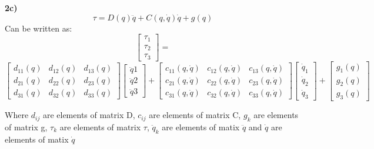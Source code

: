 \documentclass[12pt,norsk,a4paper]{article}
\begin{document}
    \newpage
    \textbf{2c)}\\
    \[\tau = D(q)\ddot q + C(q,\dot q)\dot q +g(q)\]
    Can be written as:
    \[\left[\begin{array}{c} \tau_1 \\ \tau_2 \\ \tau_3 \end{array}\right] = \]
            \[\left[\begin{array}{ccc}
                    d_{11}(q) & d_{12}(q) & d_{13}(q)\\
                    d_{21}(q) & d_{22}(q) & d_{23}(q)\\
                    d_{31}(q) & d_{32}(q) & d_{33}(q)
                \end{array}\right] \left[\begin{array}{c} \ddot q1 \\ \ddot q2 \\ \ddot q3 \end{array}\right]
            +\left[\begin{array}{ccc}
                c_{11}(q,\dot q) & c_{12}(q,\dot q) & c_{13}(q,\dot q)\\
                c_{21}(q,\dot q) & c_{22}(q,\dot q) & c_{23}(q,\dot q)\\
                c_{31}(q,\dot q) & c_{32}(q,\dot q) & c_{33}(q,\dot q)
            \end{array}\right] \left[\begin{array}{c} \dot q_1 \\ \dot q_2 \\ \dot q_3 \end{array}\right]
            +\left[\begin{array}{c}
                g_1(q) \\ g_2(q) \\ g_3(q)
            \end{array}\right]\]

    Where $d_{ij}$ are elements of matrix D, $c_{ij}$ are elements of matrix C, $g_k$ are elements of matrix g, $\tau_k$ are elements of matrix $\tau$, $\ddot q_k$ are elements of matix $\ddot q$ and $\dot q$ are elements of matix $\dot q$
\end{document}
